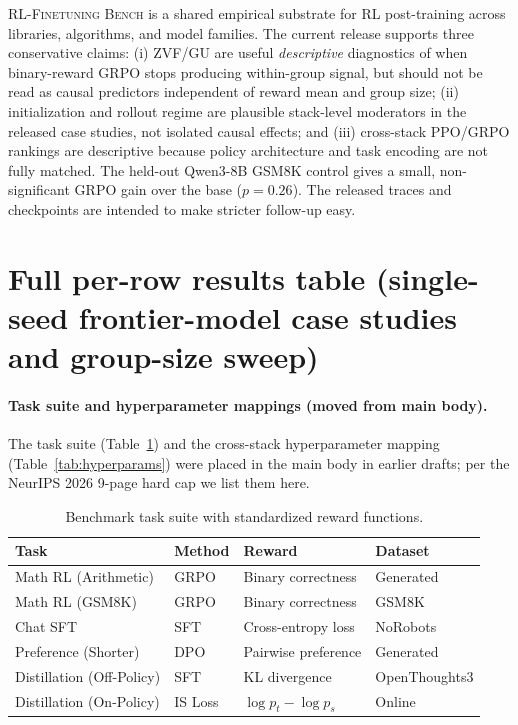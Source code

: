 \documentclass{article}
\newcommand{\ours}{\textsc{RL-Finetuning Bench}}
\begin{document}
\ours{} is a shared empirical substrate for RL post-training across libraries,
algorithms, and model families. The current release supports three
conservative claims: (i) ZVF/GU are useful \emph{descriptive} diagnostics of
when binary-reward GRPO stops producing within-group signal, but should not be
read as causal predictors independent of reward mean and group size; (ii)
initialization and rollout regime are plausible stack-level moderators in the
released case studies, not isolated causal effects; and (iii) cross-stack
PPO/GRPO rankings are descriptive because policy architecture and task encoding
are not fully matched. The held-out Qwen3-8B GSM8K control gives a small,
non-significant GRPO gain over the base ($p{=}0.26$). The released traces and
checkpoints are intended to make stricter follow-up easy.
 





\appendix


\section{Full per-row results table (single-seed frontier-model case studies and group-size sweep)}
\label{sec:appendix:full-results}

\paragraph{Task suite and hyperparameter mappings (moved from main body).}
The task suite (Table~\ref{tab:tasks}) and the cross-stack hyperparameter
mapping (Table~\ref{tab:hyperparams}) were placed in the main body in
earlier drafts; per the NeurIPS 2026 9-page hard cap we list them here.

\begin{table}[ht]
\centering
\caption{Benchmark task suite with standardized reward functions.}
\label{tab:tasks}
\begin{tabular}{llll}
\toprule
\textbf{Task} & \textbf{Method} & \textbf{Reward} & \textbf{Dataset} \\
\midrule
Math RL (Arithmetic) & GRPO & Binary correctness & Generated \\
Math RL (GSM8K) & GRPO & Binary correctness & GSM8K \\
Chat SFT & SFT & Cross-entropy loss & NoRobots \\
Preference (Shorter) & DPO & Pairwise preference & Generated \\
Distillation (Off-Policy) & SFT & KL divergence & OpenThoughts3 \\
Distillation (On-Policy) & IS Loss & $\log p_t - \log p_s$ & Online \\
\bottomrule
\end{tabular}
\end{table}
\end{document}
